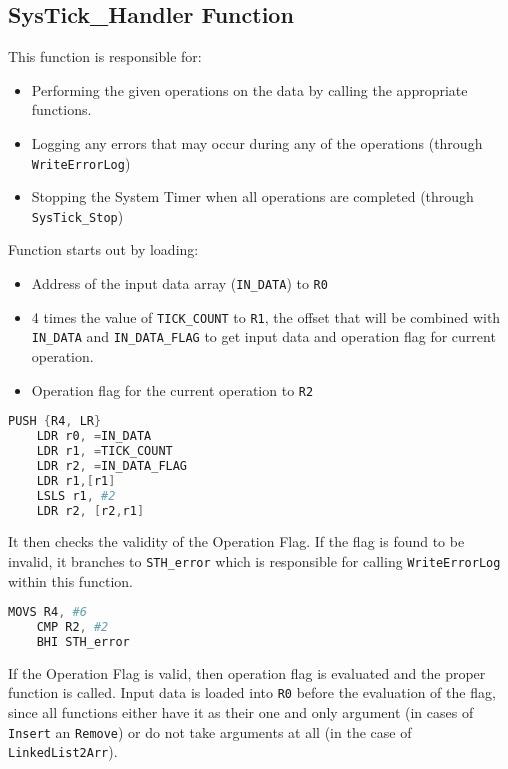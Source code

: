 \documentclass[pdftex,12pt,a4paper]{article}
\begin{document}
\subsection{SysTick\_Handler Function}
This function is responsible for:

\begin{itemize}
    \item Performing the given operations on the data by calling the appropriate functions.
    \item Logging any errors that may occur during any of the operations (through \verb|WriteErrorLog|)
    \item Stopping the System Timer when all operations are completed (through \verb|SysTick_Stop|)
\end{itemize}

Function starts out by loading:

\begin{itemize}
    \item Address of the input data array (\verb|IN_DATA|) to \verb|R0| 
    \item 4 times the value of \verb|TICK_COUNT| to \verb|R1|, the offset that will be combined with \verb|IN_DATA| and \verb|IN_DATA_FLAG| to get input data and operation flag for current operation.
    \item Operation flag for the current operation to \verb|R2|
\end{itemize}

\begin{lstlisting}[language=Assembler]
    PUSH {R4, LR}
    LDR r0, =IN_DATA
    LDR r1, =TICK_COUNT
    LDR r2, =IN_DATA_FLAG
    LDR r1,[r1]
    LSLS r1, #2
    LDR r2, [r2,r1]
\end{lstlisting}

It then checks the validity of the Operation Flag. If the flag is found to be invalid, it branches to \verb|STH_error| which is responsible for calling \verb|WriteErrorLog| within this function.

\begin{lstlisting}[language=Assembler]
    MOVS R4, #6
    CMP R2, #2
    BHI STH_error
\end{lstlisting}

If the Operation Flag is valid, then operation flag is evaluated and the proper function is called. Input data is loaded into \verb|R0| before the evaluation of the flag, since all functions either have it as their one and only argument (in cases of \verb|Insert| an \verb|Remove|) or do not take arguments at all (in the case of \verb|LinkedList2Arr|).
\end{document}
